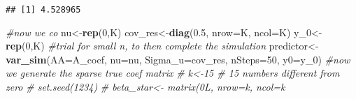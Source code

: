 \documentclass[
]{article}
\newenvironment{Shaded}{\begin{snugshade}}{\end{snugshade}}
\newcommand{\AttributeTok}[1]{\textcolor[rgb]{0.13,0.29,0.53}{#1}}
\newcommand{\CommentTok}[1]{\textcolor[rgb]{0.56,0.35,0.01}{\textit{#1}}}
\newcommand{\DecValTok}[1]{\textcolor[rgb]{0.00,0.00,0.81}{#1}}
\newcommand{\FloatTok}[1]{\textcolor[rgb]{0.00,0.00,0.81}{#1}}
\newcommand{\FunctionTok}[1]{\textcolor[rgb]{0.13,0.29,0.53}{\textbf{#1}}}
\newcommand{\NormalTok}[1]{#1}
\newcommand{\OtherTok}[1]{\textcolor[rgb]{0.56,0.35,0.01}{#1}}
\begin{document}
\begin{verbatim}
## [1] 4.528965
\end{verbatim}

\begin{Shaded}
\begin{Highlighting}[]
\CommentTok{\#now we co}
\NormalTok{nu}\OtherTok{\textless{}{-}}\FunctionTok{rep}\NormalTok{(}\DecValTok{0}\NormalTok{,K)}
\NormalTok{cov\_res}\OtherTok{\textless{}{-}}\FunctionTok{diag}\NormalTok{(}\FloatTok{0.5}\NormalTok{, }\AttributeTok{nrow=}\NormalTok{K, }\AttributeTok{ncol=}\NormalTok{K)}
\NormalTok{y\_0}\OtherTok{\textless{}{-}}\FunctionTok{rep}\NormalTok{(}\DecValTok{0}\NormalTok{,K)}
\CommentTok{\#trial  for small n, to then complete the simulation}
\NormalTok{predictor}\OtherTok{\textless{}{-}}\FunctionTok{var\_sim}\NormalTok{(}\AttributeTok{AA=}\NormalTok{A\_coef, }\AttributeTok{nu=}\NormalTok{nu, }\AttributeTok{Sigma\_u=}\NormalTok{cov\_res, }\AttributeTok{nSteps=}\DecValTok{50}\NormalTok{, }\AttributeTok{y0=}\NormalTok{y\_0)}
\CommentTok{\#now we generate the sparse true coef matrix }
\CommentTok{\# k\textless{}{-}15 \# 15 numbers different from zero}
\CommentTok{\# set.seed(1234)}
\CommentTok{\# beta\_star\textless{}{-} matrix(0L, nrow=k, ncol=k}
\end{Highlighting}
\end{Shaded}

\printbibliography
\end{document}
